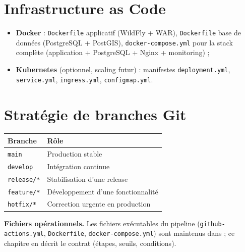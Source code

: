 \section{Infrastructure as Code}

\begin{itemize}
  \item \textbf{Docker} : \texttt{Dockerfile} applicatif (WildFly + WAR),
        \texttt{Dockerfile} base de données (PostgreSQL + PostGIS),
        \texttt{docker-compose.yml} pour la stack complète
        (application + PostgreSQL + Nginx + monitoring) ;
  \item \textbf{Kubernetes} (optionnel, scaling futur) : manifestes
        \texttt{deployment.yml}, \texttt{service.yml}, \texttt{ingress.yml},
        \texttt{configmap.yml}.
\end{itemize}

\section{Stratégie de branches Git}

\begin{center}
\begin{tabular}{ll}
\toprule
\textbf{Branche} & \textbf{Rôle} \\
\midrule
\texttt{main}       & Production stable \\
\texttt{develop}    & Intégration continue \\
\texttt{release/*}  & Stabilisation d'une release \\
\texttt{feature/*}  & Développement d'une fonctionnalité \\
\texttt{hotfix/*}   & Correction urgente en production \\
\bottomrule
\end{tabular}
\end{center}

\begin{encadre}
\textbf{Fichiers opérationnels.} Les fichiers exécutables du pipeline
(\texttt{github-actions.yml}, \texttt{Dockerfile},
\texttt{docker-compose.yml}) sont maintenus dans
 ;
ce chapitre en
décrit le contrat (étapes, seuils, conditions).
\end{encadre}
